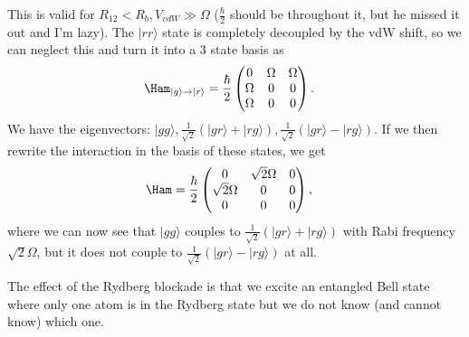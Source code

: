 \documentclass[a4paper, 11pt, normalem]{report}
\begin{document}
This is valid for $R_{12}<R_b,V_{vdW}\gg\Omega$ ($\frac{\hbar}{2}$ should be throughout it, but he missed it out and I'm lazy).
The $|rr\rangle$ state is completely decoupled by the vdW shift, so we can neglect this and turn it into a 3 state basis as
\begin{align}
    \Ham_{|g\rangle\to|r\rangle} &= \frac{\hbar}{2}\begin{pmatrix} 0&\Omega&\Omega\\\Omega&0&0\\\Omega&0&0\end{pmatrix}.
\end{align}
We have the eigenvectors: $|gg\rangle, \frac{1}{\sqrt{2}}\left(|gr\rangle+|rg\rangle\right), \frac{1}{\sqrt{2}}\left(|gr\rangle-|rg\rangle\right)$.
If we then rewrite the interaction in the basis of these states, we get
\begin{align}
    \Ham &= \frac{\hbar}{2}\begin{pmatrix} 0 & \sqrt{2}\Omega & 0 \\\sqrt{2}\Omega & 0 & 0 \\ 0 & 0 & 0\end{pmatrix},
\end{align}
where we can now see that $|gg\rangle$ couples to $\frac{1}{\sqrt{2}}(|gr\rangle+|rg\rangle)$ with Rabi frequency $\sqrt{2}\Omega$, but it does not couple to $\frac{1}{\sqrt{2}}(|gr\rangle-|rg\rangle)$ at all.
\begin{figure}[H]
    \centering
    \vspace{-15pt}
\end{figure}
The effect of the Rydberg blockade is that we excite an entangled Bell state where only one atom is in the Rydberg state but we do not know (and cannot know) which one.
\end{document}
